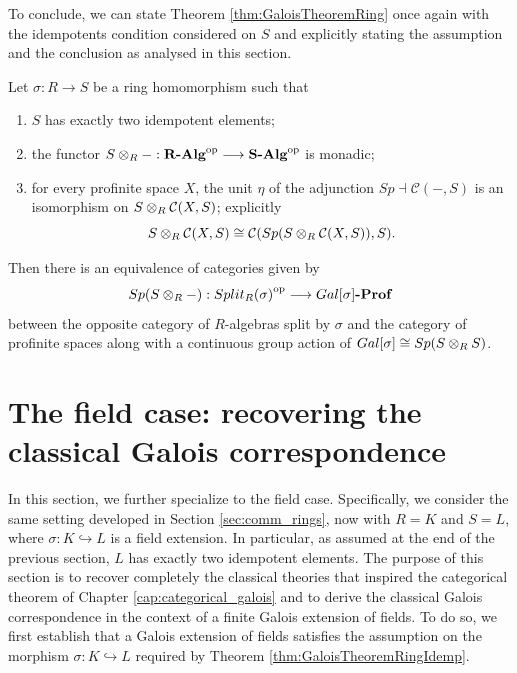 To conclude, we can state Theorem \ref{thm:GaloisTheoremRing} once again with the idempotents condition considered on $S$ and explicitly stating the assumption and the conclusion as analysed in this section.
\begin{theorem}
\label{thm:GaloisTheoremRingIdemp}
    Let $\sigma:R\to S$ be a ring homomorphism such that
    \begin{enumerate}
        \item $S$ has exactly two idempotent elements;
        \item the functor $S\otimes_{R}-:{\textbf{R-Alg}}^{\mathrm{op}}\longrightarrow{\textbf{S-Alg}}^{\mathrm{op}}$ is monadic;
        \item for every profinite space $X$, the unit $\eta$ of the adjunction $Sp\dashv\mathcal{C}(-,S)$ is an isomorphism on $S\otimes_{R}\mathcal{C}(X,S)$; explicitly
        \[ S\otimes_{R}\mathcal{C}(X,S)\cong \mathcal{C}(Sp(S\otimes_{R}\mathcal{C}(X,S)),S). \]
    \end{enumerate}
    Then there is an equivalence of categories given by
    \[ Sp(S\otimes_{R}-):{Split_R(\sigma)}^{\mathrm{op}}\longrightarrow Gal[\sigma]\textbf{-Prof} \]
    between the opposite category of $R$-algebras split by $\sigma$ and the category of profinite spaces along with a continuous group action of $Gal[\sigma]\cong Sp(S\otimes_{R}S)$.
\end{theorem}


\section{The field case: recovering the classical Galois correspondence}
\label{sec:field_case}

In this section, we further specialize to the field case. Specifically, we consider the same setting developed in Section \ref{sec:comm_rings}, now with $R=K$ and $S=L$, where $\sigma:K\hookrightarrow L$ is a field extension. In particular, as assumed at the end of the previous section, $L$ has exactly two idempotent elements. The purpose of this section is to recover completely the classical theories that inspired the categorical theorem of Chapter \ref{cap:categorical_galois} and to derive the classical Galois correspondence in the context of a finite Galois extension of fields. To do so, we first establish that a Galois extension of fields satisfies the assumption on the morphism $\sigma:K\hookrightarrow L$ required by Theorem \ref{thm:GaloisTheoremRingIdemp}.

